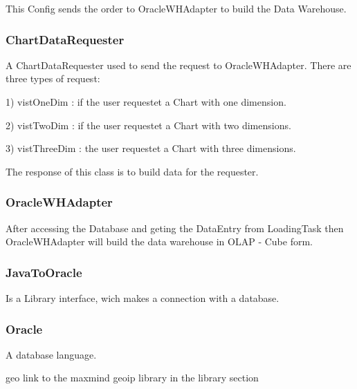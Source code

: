 This Config sends the order to OracleWHAdapter to build the Data Warehouse.

\subsubsection*{ChartDataRequester}

A ChartDataRequester used to send the request to OracleWHAdapter.
There are three types of request:

1) vistOneDim : if the user requestet a Chart with one dimension.

2) vistTwoDim : if the user requestet a Chart with two dimensions.

3) vistThreeDim : the user requestet a Chart with three dimensions.

The response of this class is to build data for the requester.

\subsubsection*{OracleWHAdapter}

After accessing the Database and geting the DataEntry from LoadingTask then OracleWHAdapter will build
the data warehouse in OLAP - Cube form. 
 
\subsubsection*{JavaToOracle}

Is a Library interface, wich makes a connection with a database.

\subsubsection*{Oracle}

A database language. %

geo
 link to the maxmind geoip library in the library section
